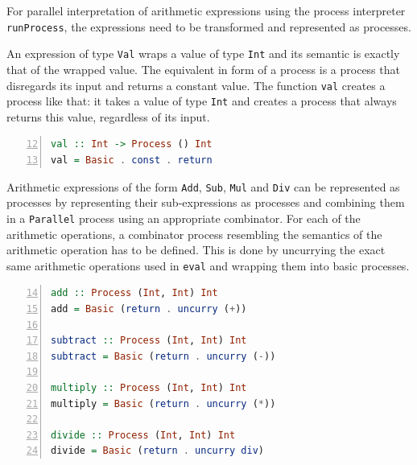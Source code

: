 For parallel interpretation of arithmetic expressions using the process interpreter \linebreak \texttt{runProcess}, the expressions need to be transformed and represented as processes.

An expression of type \texttt{Val} wraps a value of type \texttt{Int} and its semantic is exactly that of the wrapped value. The equivalent in form of a process is a process that disregards its input and returns a constant value. The function \texttt{val} creates a process like that: it takes a value of type \texttt{Int} and creates a process that always returns this value, regardless of its input.
\begin{lstlisting}[language=Haskell, caption=A function that generates basic processes for the representation of \texttt{Val} expressions., label=lst:arith_val, numbers=left, frame=bt, firstnumber=12]
val :: Int -> Process () Int
val = Basic . const . return
\end{lstlisting}

Arithmetic expressions of the form \texttt{Add}, \texttt{Sub}, \texttt{Mul} and \texttt{Div} can be represented as processes by representing their sub-expressions as processes and combining them in a \texttt{Parallel} process using an appropriate combinator.  For each of the arithmetic operations, a combinator process resembling the semantics of the arithmetic operation has to be defined. This is done by uncurrying the exact same arithmetic operations used in \texttt{eval} and wrapping them into basic processes.
\begin{lstlisting}[language=Haskell, caption=Basic processes for the combination of results from parallel interpretation of sub-expressions., label=lst:arith_combinators,numbers=left, frame=bt, firstnumber=14]
add :: Process (Int, Int) Int
add = Basic (return . uncurry (+))

subtract :: Process (Int, Int) Int
subtract = Basic (return . uncurry (-))

multiply :: Process (Int, Int) Int
multiply = Basic (return . uncurry (*))

divide :: Process (Int, Int) Int
divide = Basic (return . uncurry div)
\end{lstlisting}

